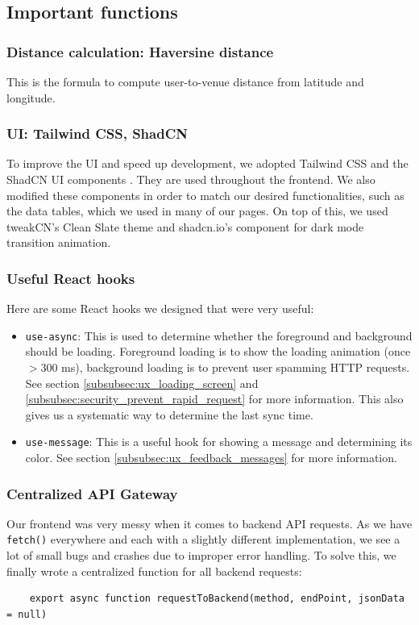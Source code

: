 \subsection{Important functions}
\label{subsec:important_functions}
\subsubsection{Distance calculation: Haversine distance}
This is the formula to compute user-to-venue distance from latitude and longitude.
\subsubsection{UI: Tailwind CSS, ShadCN}
To improve the UI and speed up development, we adopted Tailwind CSS and the
ShadCN UI components \cite{shadcn_ui}. They are used throughout the frontend. We also modified
these components in order to match our desired functionalities, such as the data tables, which
we used in many of our pages. On top of this, we used tweakCN's Clean Slate theme \cite{tweakcn} and
shadcn.io's component \cite{shadcn_io} for dark mode transition animation.
\subsubsection{Useful React hooks}
Here are some React hooks we designed that were very useful:
\begin{itemize}%
    \item \verb|use-async|: This is used to determine whether the foreground and background should be loading.
    Foreground loading is to show the loading animation (once \(> 300\) ms), background loading
    is to prevent user spamming HTTP requests. See section \ref{subsubsec:ux_loading_screen} and 
    \ref{subsubsec:security_prevent_rapid_request} for more information. This also
    gives us a systematic way to determine the last sync time.
    \item \verb|use-message|: This is a useful hook for showing a message and determining its color.
    See section \ref{subsubsec:ux_feedback_messages} for more information.
\end{itemize}
\subsubsection{Centralized API Gateway}
Our frontend was very messy when it comes to backend API requests. As we have \verb|fetch()| everywhere
and each with a slightly different implementation, we see a lot of small bugs and crashes due to improper error handling.
To solve this, we finally wrote a centralized function for all backend requests:
\begin{verbatim}
    export async function requestToBackend(method, endPoint, jsonData = null)
\end{verbatim}

